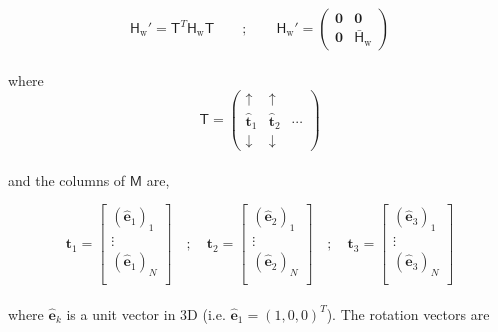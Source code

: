 \documentclass[10pt]{article}
\begin{document}
\begin{equation}
	\mathsf{H}_\text{w}' = \mathsf{T}^T \mathsf{H}_\text{w} \mathsf{T} \qquad ; \qquad \mathsf{H}_\text{w}' = \begin{pmatrix}
		\boldsymbol{0} & \boldsymbol{0} \\
		\boldsymbol{0} & \bar{\mathsf{H}}_\text{w}
	\end{pmatrix}
\end{equation}
\\
where
\begin{equation}
	\mathsf{T} = \begin{pmatrix}
		\uparrow & \uparrow  & \\
		\hat{\boldsymbol{t}}_1 & \hat{\boldsymbol{t}}_2 & \cdots \\
		\downarrow & \downarrow &
	\end{pmatrix}
\end{equation}
\\
and the columns of $\mathsf{M}$ are,

\begin{equation}
	\boldsymbol{t}_1 = \begin{bmatrix}
		(\hat{\boldsymbol{e}}_1)_1 \\
		\vdots \\
		(\hat{\boldsymbol{e}}_1)_N \\
	\end{bmatrix}
	\quad ; \quad
	\boldsymbol{t}_2 = \begin{bmatrix}
		(\hat{\boldsymbol{e}}_2)_1 \\
		\vdots \\
		(\hat{\boldsymbol{e}}_2)_N \\
	\end{bmatrix}
	\quad ; \quad
	\boldsymbol{t}_3 = \begin{bmatrix}
		(\hat{\boldsymbol{e}}_3)_1 \\
		\vdots \\
		(\hat{\boldsymbol{e}}_3)_N \\
	\end{bmatrix}
\end{equation}
\\
where $\hat{\boldsymbol{e}}_k$ is a unit vector in 3D (i.e. $\hat{\boldsymbol{e}}_1 = (1, 0, 0)^T$). The rotation vectors are
\end{document}
